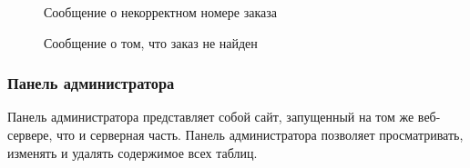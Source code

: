 \documentclass[a4paper]{article}
\begin{document}
				\begin{figure}[H]
					\centering
					\caption{Сообщение о некорректном номере заказа}
				\end{figure}
				
				\begin{figure}[H]
					\centering
					\caption{Сообщение о том, что заказ не найден}
				\end{figure}
			\subsubsection{Панель администратора}
				Панель администратора представляет собой сайт, запущенный на том же веб-сервере, что и серверная часть. Панель администратора позволяет просматривать, изменять и удалять содержимое всех таблиц.
				
\end{document}
